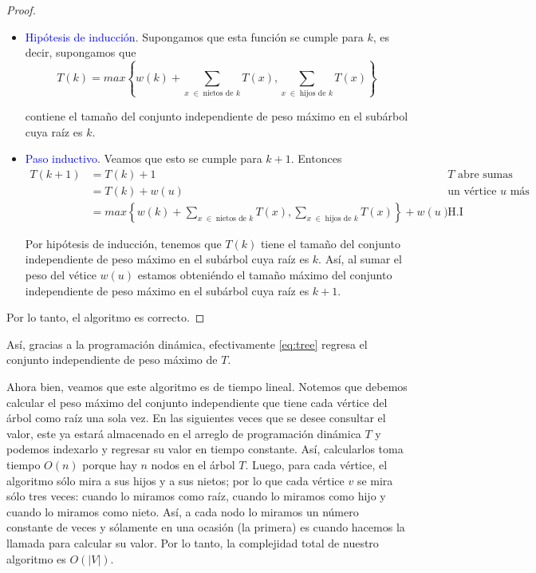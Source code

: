 \documentclass[letterpaper,11pt]{article}
\begin{document}
\begin{enumerate}
\begin{proof}
\begin{itemize}
            \item \textcolor{blue}{Hipótesis de inducción}. Supongamos que 
            esta función se cumple para $k$, es decir, supongamos que 
            \begin{equation*}
                T(k) = max \left\{w(k) + \sum_{x \; \in \;
                \text{nietos de $k$}} T(x), \sum_{x \; \in \; 
                \text{hijos de $k$}} T(x) \right\} 
            \end{equation*}

            contiene el tamaño del conjunto independiente de peso máximo en 
            el subárbol cuya raíz es $k$.

            \item \textcolor{blue}{Paso inductivo}. Veamos que esto se cumple 
            para $k+1$. Entonces 
            \begin{align*}
                T(k+1) 
                &= T(k) + 1 
                && \text{$T$ abre sumas} \\
                &= T(k) + w(u) 
                && \text{un vértice $u$ más} \\
                &= max \left\{w(k) + \sum_{x \; \in \; \text{nietos de $k$}} 
                T(x), \sum_{x \; \in \; \text{hijos de $k$}} T(x) \right\}
                + w(u)
                && \text{H.I}
            \end{align*}

            Por hipótesis de inducción, tenemos que $T(k)$ tiene el tamaño 
            del conjunto independiente de peso máximo en el subárbol cuya 
            raíz es $k$. Así, al sumar el peso del vétice $w(u)$ estamos 
            obteniéndo el tamaño máximo del conjunto independiente de peso 
            máximo en el subárbol cuya raíz es $k+1$.
        \end{itemize}

        Por lo tanto, el algoritmo es correcto.

    \end{proof}

    Así, gracias a la programación dinámica, efectivamente \ref{eq:tree} regresa 
    el conjunto independiente de peso máximo de $T$.

    Ahora bien, veamos que este algoritmo es de tiempo lineal. Notemos que 
    debemos calcular el peso máximo del conjunto independiente que tiene cada 
    vértice del árbol como raíz una sola vez. En las siguientes veces que se
    desee consultar el valor, este ya estará almacenado en el arreglo de 
    programación dinámica $T$ y podemos indexarlo y regresar su valor en 
    tiempo constante. Así, calcularlos toma tiempo $O(n)$ porque hay $n$ nodos 
    en el árbol $T$. Luego, para cada vértice, el algoritmo sólo mira a sus 
    hijos y a sus nietos; por lo que cada vértice $v$ se mira sólo tres veces:
    cuando lo miramos como raíz, cuando lo miramos como hijo y cuando lo 
    miramos como nieto. Así, a cada nodo lo miramos un número constante de 
    veces y sólamente en una ocasión (la primera) es cuando hacemos la llamada 
    para calcular su valor. Por lo tanto, la complejidad total de nuestro 
    algoritmo es $O(|V|)$. 


\end{enumerate}
\end{document}
